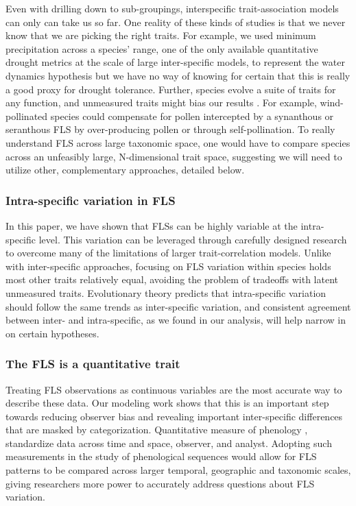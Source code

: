 \documentclass[12pt]{article}\usepackage[]{graphicx}\usepackage[]{color}
\begin{document}
\indent Even with drilling down to sub-groupings, interspecific trait-association models can only can take us so far. One reality of these kinds of studies is that we never know that we are picking the right traits. For example, we used minimum precipitation across a species' range, one of the only available quantitative drought metrics at the scale of large inter-specific models, to represent the water dynamics hypothesis but we have no way of knowing for certain that this is really a good proxy for drought tolerance. Further, species evolve a suite of traits for any function, and unmeasured traits might bias our results \citep{Davies2019}. For example, wind-pollinated species could compensate for pollen intercepted by a synanthous or seranthous FLS by over-producing pollen or through self-pollination. To really understand FLS across large taxonomic space, one would have to compare species across an unfeasibly large, N-dimensional trait space, suggesting we will need to utilize other, complementary approaches, detailed below.

\subsubsection*{Intra-specific variation in FLS}
\indent\indent In this paper, we have shown that FLSs can be highly variable at the intra-specific level. This variation can be leveraged through carefully designed research to overcome many of the limitations of larger trait-correlation models. Unlike with inter-specific approaches, focusing on FLS variation within species holds most other traits relatively equal, avoiding the problem of tradeoffs with latent unmeasured traits. Evolutionary theory predicts that intra-specific variation should follow the same trends as inter-specific variation, and consistent agreement between inter- and intra-specific, as we found in our analysis, will help narrow in on certain hypotheses.\\
\subsubsection*{The FLS is a quantitative trait}
\indent \indent Treating FLS observations as continuous variables are the most accurate way to describe these data. Our modeling work shows that this is an important step towards reducing observer bias and revealing important inter-specific differences that are masked by categorization. Quantitative measure of phenology \citep[e.g. the BBCH scale,][]{Finn2007}, standardize data across time and space, observer, and analyst. Adopting such measurements in the study of phenological sequences would allow for FLS patterns to be compared across larger temporal, geographic and taxonomic scales, giving researchers more power to accurately address questions about FLS variation.
\end{document}

